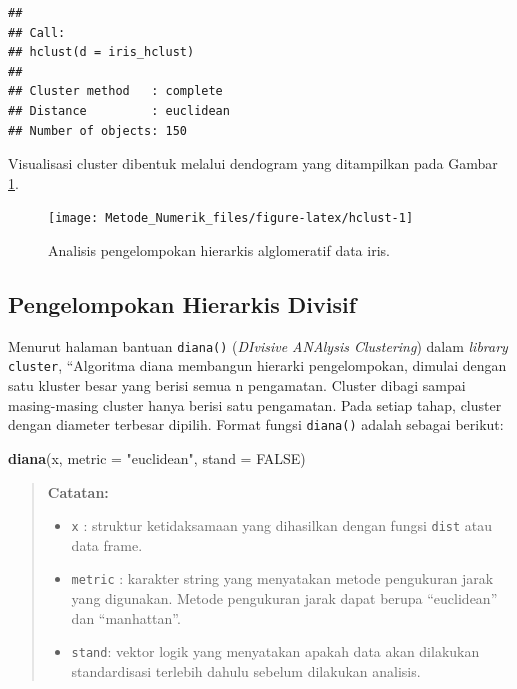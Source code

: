 \documentclass[]{book}
\newenvironment{Shaded}{\begin{snugshade}}{\end{snugshade}}
\newcommand{\DataTypeTok}[1]{\textcolor[rgb]{0.13,0.29,0.53}{#1}}
\newcommand{\KeywordTok}[1]{\textcolor[rgb]{0.13,0.29,0.53}{\textbf{#1}}}
\newcommand{\NormalTok}[1]{#1}
\newcommand{\OtherTok}[1]{\textcolor[rgb]{0.56,0.35,0.01}{#1}}
\newcommand{\StringTok}[1]{\textcolor[rgb]{0.31,0.60,0.02}{#1}}
\providecommand{\tightlist}{%
  \setlength{\itemsep}{0pt}\setlength{\parskip}{0pt}}
\theoremstyle{definition}
\theoremstyle{definition}
\theoremstyle{definition}
\theoremstyle{remark}
\begin{document}
\begin{verbatim}
## 
## Call:
## hclust(d = iris_hclust)
## 
## Cluster method   : complete 
## Distance         : euclidean 
## Number of objects: 150
\end{verbatim}

Visualisasi cluster dibentuk melalui dendogram yang ditampilkan pada Gambar \ref{fig:hclust}.

\begin{figure}

{\centering \texttt{[image: Metode\_Numerik\_files/figure-latex/hclust-1]} 

}

\caption{Analisis pengelompokan hierarkis alglomeratif data iris.}\label{fig:hclust}
\end{figure}

\hypertarget{pengelompokan-hierarkis-divisif}{%
\subsection{Pengelompokan Hierarkis Divisif}\label{pengelompokan-hierarkis-divisif}}

Menurut halaman bantuan \texttt{diana()} (\emph{DIvisive ANAlysis Clustering}) dalam \emph{library} \texttt{cluster}, ``Algoritma diana membangun hierarki pengelompokan, dimulai dengan satu kluster besar yang berisi semua n pengamatan. Cluster dibagi sampai masing-masing cluster hanya berisi satu pengamatan. Pada setiap tahap, cluster dengan diameter terbesar dipilih. Format fungsi \texttt{diana()} adalah sebagai berikut:

\begin{Shaded}
\begin{Highlighting}[]
\KeywordTok{diana}\NormalTok{(x, }\DataTypeTok{metric =} \StringTok{"euclidean"}\NormalTok{, }\DataTypeTok{stand =} \OtherTok{FALSE}\NormalTok{)}
\end{Highlighting}
\end{Shaded}

\begin{quote}
\textbf{Catatan:}

\begin{itemize}
\tightlist
\item
  \texttt{x} : struktur ketidaksamaan yang dihasilkan dengan fungsi \texttt{dist} atau data frame.
\item
  \texttt{metric} : karakter string yang menyatakan metode pengukuran jarak yang digunakan. Metode pengukuran jarak dapat berupa ``euclidean'' dan ``manhattan''.
\item
  \texttt{stand}: vektor logik yang menyatakan apakah data akan dilakukan standardisasi terlebih dahulu sebelum dilakukan analisis.
\end{itemize}
\end{quote}
\end{document}
